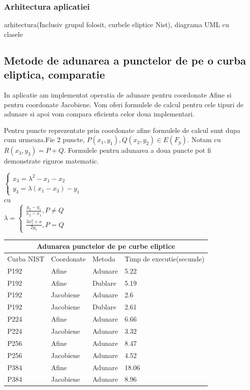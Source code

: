\subsubsection{Arhitectura aplicatiei}
\label{sec:sec01}
arhitectura(Inclusiv grupul folosit, curbele eliptice Nist), diagrama UML cu clasele

\subsection{Metode de adunarea a punctelor de pe o curba eliptica, comparatie}
\label{subsec:subsec02}
In aplicatie am implementat operatia de adunare pentru coordonate Afine si pentru coordonate Jacobiene. Vom oferi formulele de calcul pentru cele tipuri de adunare si apoi vom compara eficienta celor doua implementari.
\begin{dfn}
Pentru puncte reprezentate prin coordonate afine formulele de calcul sunt dupa cum urmeaza.Fie 2 puncte, $P(x_{1}, y_1), Q(x_2, y_2)\in E(F_p)$. Notam cu $R(x_3, y_3) = P + Q$. Formulele pentru adunarea a doua puncte pot fi demonstrate riguros matematic.

$\begin{cases} 
    x_3 = \lambda^2 - x_1 - x_2 \\
    y_3 =  \lambda (x_1-x_3) - y_1
   \end{cases}$
 \\cu 
 \\$
 \lambda = 
 \begin{cases}
 \frac{y_2 - y_1}{x_2 - x_1}, P \neq Q \\ 
 \frac{3x^{2}_1 + a}{2y_1}, P = Q
 \end{cases}$ \\
\end{dfn}

\begin{dem}

\end{dem}



\begin{tabular}{ |p{3cm}||p{3cm}|p{3cm}|p{3cm}|  }
 \hline
 \multicolumn{4}{|c|}{Adunarea punctelor de pe curbe eliptice} \\
 \hline
 Curba NIST& Coordonate &Metoda &Timp de executie(secunde)\\
 \hline
 P192   & Afine    &Adunare& 5.22\\
 P192&Afine  & Dublare & 5.19\\
 P192 &Jacobiene & Adunare& 2.6\\
 P192&Jacobiene & Dublare & 2.61\\
 P224& Afine & Adunare & 6.66\\
 P224& Jacobiene & Adunare   &3.32\\
 P256& Afine  & Adunare& 8.47\\
 P256& Jacobiene  & Adunare& 4.52\\
 P384& Afine  & Adunare& 18.06\\
 P384& Jacobiene  & Adunare& 8.96\\
 \hline
\end{tabular}

